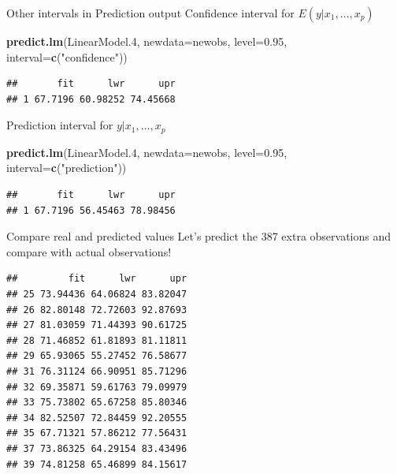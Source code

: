 \documentclass[
  ignorenonframetext,
]{beamer}
\newenvironment{Shaded}{\begin{snugshade}}{\end{snugshade}}
\newcommand{\AttributeTok}[1]{\textcolor[rgb]{0.13,0.29,0.53}{#1}}
\newcommand{\FloatTok}[1]{\textcolor[rgb]{0.00,0.00,0.81}{#1}}
\newcommand{\FunctionTok}[1]{\textcolor[rgb]{0.13,0.29,0.53}{\textbf{#1}}}
\newcommand{\NormalTok}[1]{#1}
\newcommand{\StringTok}[1]{\textcolor[rgb]{0.31,0.60,0.02}{#1}}
\begin{document}
\begin{frame}[fragile]{Other intervals in Prediction output}
\label{other-intervals-in-prediction-output}
Confidence interval for \(E(y|x_1, \ldots, x_p)\)

\begin{Shaded}
\begin{Highlighting}[]
\FunctionTok{predict.lm}\NormalTok{(LinearModel}\FloatTok{.4}\NormalTok{, }\AttributeTok{newdata=}\NormalTok{newobs, }
           \AttributeTok{level=}\FloatTok{0.95}\NormalTok{, }\AttributeTok{interval=}\FunctionTok{c}\NormalTok{(}\StringTok{"confidence"}\NormalTok{))}
\end{Highlighting}
\end{Shaded}

\begin{verbatim}
##       fit      lwr      upr
## 1 67.7196 60.98252 74.45668
\end{verbatim}

Prediction interval for \(y|x_1, \ldots, x_p\)

\begin{Shaded}
\begin{Highlighting}[]
\FunctionTok{predict.lm}\NormalTok{(LinearModel}\FloatTok{.4}\NormalTok{, }\AttributeTok{newdata=}\NormalTok{newobs, }
           \AttributeTok{level=}\FloatTok{0.95}\NormalTok{, }\AttributeTok{interval=}\FunctionTok{c}\NormalTok{(}\StringTok{"prediction"}\NormalTok{))}
\end{Highlighting}
\end{Shaded}

\begin{verbatim}
##       fit      lwr      upr
## 1 67.7196 56.45463 78.98456
\end{verbatim}
\end{frame}

\begin{frame}[fragile]{Compare real and predicted values}
\label{compare-real-and-predicted-values}
Let's predict the 387 extra observations and compare with actual
observations!

\begin{verbatim}
##         fit      lwr      upr
## 25 73.94436 64.06824 83.82047
## 26 82.80148 72.72603 92.87693
## 27 81.03059 71.44393 90.61725
## 28 71.46852 61.81893 81.11811
## 29 65.93065 55.27452 76.58677
## 31 76.31124 66.90951 85.71296
## 32 69.35871 59.61763 79.09979
## 33 75.73802 65.67258 85.80346
## 34 82.52507 72.84459 92.20555
## 35 67.71321 57.86212 77.56431
## 37 73.86325 64.29154 83.43496
## 39 74.81258 65.46899 84.15617
\end{verbatim}
\end{frame}
\end{document}
